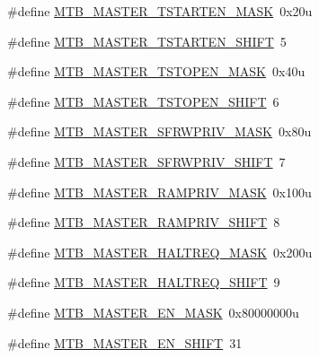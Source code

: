\begin{DoxyCompactItemize}
\item 
\#define \hyperlink{group___m_t_b___register___masks_gace5fa3a07ba94b52b019ba4adf6ded1d}{M\+T\+B\+\_\+\+M\+A\+S\+T\+E\+R\+\_\+\+T\+S\+T\+A\+R\+T\+E\+N\+\_\+\+M\+A\+SK}~0x20u
\item 
\#define \hyperlink{group___m_t_b___register___masks_ga7ffc111a955bf51244819ab23048d2e9}{M\+T\+B\+\_\+\+M\+A\+S\+T\+E\+R\+\_\+\+T\+S\+T\+A\+R\+T\+E\+N\+\_\+\+S\+H\+I\+FT}~5
\item 
\#define \hyperlink{group___m_t_b___register___masks_ga6497971415da774904dac543bebf23bb}{M\+T\+B\+\_\+\+M\+A\+S\+T\+E\+R\+\_\+\+T\+S\+T\+O\+P\+E\+N\+\_\+\+M\+A\+SK}~0x40u
\item 
\#define \hyperlink{group___m_t_b___register___masks_ga3b7209aa39e65d10758a0ea962d32e8a}{M\+T\+B\+\_\+\+M\+A\+S\+T\+E\+R\+\_\+\+T\+S\+T\+O\+P\+E\+N\+\_\+\+S\+H\+I\+FT}~6
\item 
\#define \hyperlink{group___m_t_b___register___masks_ga445e1c53e9424d2e2c730fcd390009d7}{M\+T\+B\+\_\+\+M\+A\+S\+T\+E\+R\+\_\+\+S\+F\+R\+W\+P\+R\+I\+V\+\_\+\+M\+A\+SK}~0x80u
\item 
\#define \hyperlink{group___m_t_b___register___masks_gae6e1de627837f38d2a5cab79cf13f295}{M\+T\+B\+\_\+\+M\+A\+S\+T\+E\+R\+\_\+\+S\+F\+R\+W\+P\+R\+I\+V\+\_\+\+S\+H\+I\+FT}~7
\item 
\#define \hyperlink{group___m_t_b___register___masks_ga93d1c4a852b65c4f91c847930414e3bf}{M\+T\+B\+\_\+\+M\+A\+S\+T\+E\+R\+\_\+\+R\+A\+M\+P\+R\+I\+V\+\_\+\+M\+A\+SK}~0x100u
\item 
\#define \hyperlink{group___m_t_b___register___masks_gadd17751eced675ec41c38640f7922cc3}{M\+T\+B\+\_\+\+M\+A\+S\+T\+E\+R\+\_\+\+R\+A\+M\+P\+R\+I\+V\+\_\+\+S\+H\+I\+FT}~8
\item 
\#define \hyperlink{group___m_t_b___register___masks_gaee5817b3564e9ce65cc9c26af3055978}{M\+T\+B\+\_\+\+M\+A\+S\+T\+E\+R\+\_\+\+H\+A\+L\+T\+R\+E\+Q\+\_\+\+M\+A\+SK}~0x200u
\item 
\#define \hyperlink{group___m_t_b___register___masks_ga5f262014ec318bcd2273ade4e32ab362}{M\+T\+B\+\_\+\+M\+A\+S\+T\+E\+R\+\_\+\+H\+A\+L\+T\+R\+E\+Q\+\_\+\+S\+H\+I\+FT}~9
\item 
\#define \hyperlink{group___m_t_b___register___masks_gab9f73fe136cde10e51b5192c621aaf7d}{M\+T\+B\+\_\+\+M\+A\+S\+T\+E\+R\+\_\+\+E\+N\+\_\+\+M\+A\+SK}~0x80000000u
\item 
\#define \hyperlink{group___m_t_b___register___masks_ga48c3714ccdd23d6fae7221619e7a3b29}{M\+T\+B\+\_\+\+M\+A\+S\+T\+E\+R\+\_\+\+E\+N\+\_\+\+S\+H\+I\+FT}~31

\end{DoxyCompactItemize}

